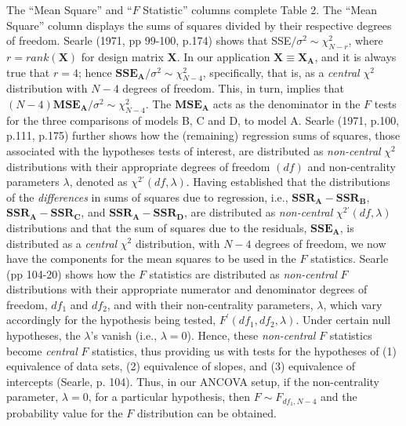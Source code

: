 \documentclass[11pt, oneside]{article}   	%
\begin{document}
The ``Mean Square'' and ``$F$ Statistic'' columns complete Table 2.  The ``Mean Square'' column displays the sums of squares divided by their respective degrees of freedom.  Searle (1971, pp 99-100, p.174) shows that  SSE$/ \sigma^{2} \sim \chi^{2}_{N-r} $,  where $ r = rank(\mathbf{X})  $ for design matrix $  \mathbf{X} $.  In our application  $ \mathbf{X} \equiv \mathbf{X_{A}}  $, and it is always true that $  r = 4  $; hence   $ \mathbf{SSE_{A}} / \sigma^{2} \sim \chi^{2}_{N-4} $, specifically, that is, as a \emph{central} $ \chi^{2}  $ distribution with $  N - 4  $ degrees of freedom.  This, in turn, implies that $  (N-4)  \mathbf{MSE_{A}} / \sigma^{2} \sim \chi^{2}_{N-4} $.  The $ \mathbf{MSE_{A}}  $ acts as the denominator in the $ F $ tests for the three comparisons of models B, C and D, to model A. Searle (1971, p.100, p.111, p.175) further shows how the (remaining) regression sums of squares, those  associated with the hypotheses tests of interest, are distributed as \emph{non-central}  $ \chi^{2}  $ distributions with their appropriate degrees of freedom $ (df) $ and non-centrality parameters $  \lambda $, denoted as $ \chi^{2'}(df, \lambda)$. Having established that the distributions of the \emph{differences} in sums of squares due to regression, i.e., $ \mathbf{SSR_{A} - \mathbf{SSR_{B}}} $,  $ \mathbf{SSR_{A} - \mathbf{SSR_{C}}} $, and $ \mathbf{SSR_{A} - \mathbf{SSR_{D}}} $, are distributed as \emph{non-central}  $ \chi^{2'}(df, \lambda)$ distributions and that the sum of squares due to the residuals, $  \mathbf{SSE_{A}} $, is distributed  as a \emph{central} $ \chi^{2}  $ distribution, with $  N - 4  $ degrees of freedom, we now have the components for the mean squares to be used in the $ F $ statistics. Searle (pp 104-20) shows how the $ F $ statistics are distributed as \emph{non-central} $ F $ distributions with their appropriate numerator and denominator degrees of freedom,  $ df_{1}  $ and $ df_{2}  $, and with their non-centrality parameters, $  \lambda $, which vary accordingly for the hypothesis being tested, $  F^{'} (df_{1}, df_{2}, \lambda ) $. Under certain null hypotheses, the $ \lambda  $'s vanish (i.e., $  \lambda = 0 $). Hence, these \emph{non-central} $  F $ statistics become  \emph{central} $  F $ statistics, thus providing us with tests for the hypotheses of (1) equivalence of data sets, (2) equivalence of slopes, and (3) equivalence of intercepts (Searle, p. 104).  Thus, in our ANCOVA setup, if the non-centrality parameter, $  \lambda = 0 $, for a particular hypothesis, then $  F \sim F_{df_{1}, N-4}$ and the probability value for the $ F $ distribution can be obtained.       
\end{document}
